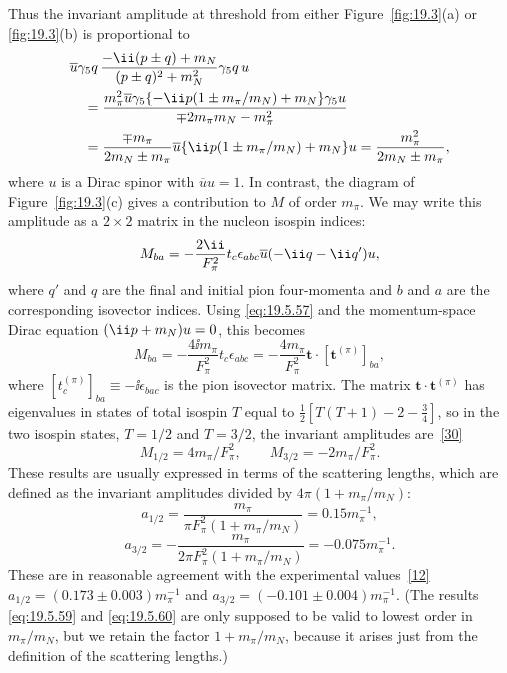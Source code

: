 Thus the invariant amplitude at threshold from either Figure~\ref{fig:19.3}(a) or \ref{fig:19.3}(b) is proportional to
\begin{align*}
&\overline u\gamma_5\sl{q}\,
\frac{-\ii(\sl{p}\mathbin{\pm}\sl{q})+m_N}
{(p\mathbin{\pm}q)^2+m_N^2}
\gamma_5\sl{q}\,u
\\
&\quad=
\frac{m_\pi^2\overline u\gamma_5
\{-\ii\sl{p}(1\mathbin{\pm}m_\pi/m_N)+m_N\}
\gamma_5u}
{\mp2m_\pi m_N-m_\pi^2}
\\
&\quad=
\frac{\mp m_\pi}{2m_N\mathbin{\pm}m_\pi}
\overline u\{\ii\sl{p}(1\mathbin{\pm}m_\pi/m_N)+m_N\}u
=\frac{m_\pi^2}{2m_N\mathbin{\pm}m_\pi},
\end{align*}
where $u$ is a Dirac spinor with $\overline uu=1$. In contrast, the diagram of Figure~\ref{fig:19.3}(c) gives a contribution to $M$ of order $m_\pi$. We may write this amplitude as a $2\times2$ matrix in the nucleon isospin indices:
\[
M_{ba}
=-\frac{2\ii}{F_\pi^2}t_c\epsilon_{abc}
\overline u(-\ii\sl{q}-\ii\sl{q}')u,
\]
where $q'$ and $q$ are the final and initial pion four-momenta and $b$ and $a$ are the corresponding isovector indices. Using \eqref{eq:19.5.57} and the momentum-space Dirac equation $(\ii\sl{p}+m_N)u=0$, this becomes
\begin{equation}
M_{ba}
=-\frac{4\ii m_\pi}{F_\pi^2}t_c\epsilon_{abc}
=-\frac{4m_\pi}{F_\pi^2}
\boldsymbol t\cdot[\boldsymbol t^{(\pi)}]_{ba},
\tag{19.5.58}\label{eq:19.5.58}
\end{equation}
where $[t_c^{(\pi)}]_{ba}\equiv-\ii\epsilon_{bac}$ is the pion isovector matrix. The matrix $\boldsymbol t\cdot\boldsymbol t^{(\pi)}$ has eigenvalues in states of total isospin $T$ equal to $\tfrac12[T(T+1)-2-\tfrac34]$, so in the two isospin states, $T=1/2$ and $T=3/2$, the invariant amplitudes are~\hyperref[ch19-ref-30]{[30]}
\[
M_{1/2}=4m_\pi/F_\pi^2,
\qquad
M_{3/2}=-2m_\pi/F_\pi^2.
\]
These results are usually expressed in terms of the scattering lengths, which are defined as the invariant amplitudes divided by $4\pi(1+m_\pi/m_N)$:
\begin{equation}
a_{1/2}
=\frac{m_\pi}{\pi F_\pi^2(1+m_\pi/m_N)}
=0.15m_\pi^{-1},
\tag{19.5.59}\label{eq:19.5.59}
\end{equation}
\begin{equation}
a_{3/2}
=-\frac{m_\pi}{2\pi F_\pi^2(1+m_\pi/m_N)}
=-0.075m_\pi^{-1}.
\tag{19.5.60}\label{eq:19.5.60}
\end{equation}
These are in reasonable agreement with the experimental values~\hyperref[ch19-ref-12]{[12]} $a_{1/2}=(0.173\mathbin{\pm}0.003)m_\pi^{-1}$ and $a_{3/2}=(-0.101\mathbin{\pm}0.004)m_\pi^{-1}$. (The results \eqref{eq:19.5.59} and \eqref{eq:19.5.60} are only supposed to be valid to lowest order in $m_\pi/m_N$, but we retain the factor $1+m_\pi/m_N$, because it arises just from the definition of the scattering lengths.)

